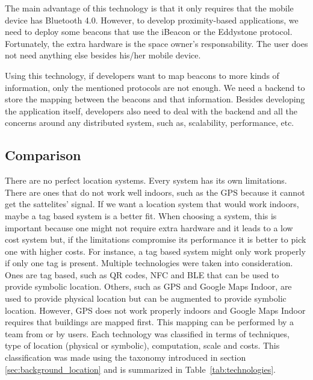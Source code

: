 The main advantage of this technology is that it only requires that the mobile device has Bluetooth 4.0.
However, to develop proximity-based applications, we need to deploy some beacons that use the iBeacon or the Eddystone protocol.
Fortunately, the extra hardware is the space owner's responsability.
The user does not need anything else besides his/her mobile device.

Using this technology, if developers want to map beacons to more kinds of information, only the mentioned protocols are not enough.
We need a backend to store the mapping between the beacons and that information.
Besides developing the application itself, developers also need to deal with the backend and all the concerns around any distributed system, such as, scalability, performance, etc.

\subsection{Comparison}
\label{sub:background_overview}
There are no perfect location systems. Every system has its own limitations.
There are ones that do not work well indoors, such as the \gls{GPS} because it cannot get the sattelites' signal.
If we want a location system that would work indoors, maybe a tag based system is a better fit.
When choosing a system, this is important because one might not require extra hardware and it leads to a low cost system but, if the limitations compromise its performance it is better to pick one with higher costs.
For instance, a tag based system might only work properly if only one tag is present.
Multiple technologies were taken into consideration.
Ones are tag based, such as \gls{QR} codes, \gls{NFC} and \gls{BLE} that can be used to provide symbolic location.
Others, such as \gls{GPS} and Google Maps Indoor, are used to provide physical location but can be augmented to provide symbolic location.
However, \gls{GPS} does not work properly indoors and Google Maps Indoor requires that buildings are mapped first. This mapping can be performed by a team from  or by users.
Each technology was classified in terms of techniques, type of location (physical or symbolic), computation, scale and costs.
This classification was made using the taxonomy introduced in section \ref{sec:background_location} and is summarized in Table~\ref{tab:technologies}.


